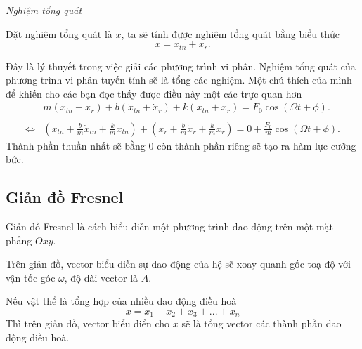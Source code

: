 \documentclass[12pt]{article}
\begin{document}
\underline{\textit{Nghiệm tổng quát}}

Đặt nghiệm tổng quát là \(x\), ta sẽ tính được nghiệm tổng quát bằng biểu thức
\begin{equation}
    x = x_{tn} + x_r.
\end{equation}

Đây là lý thuyết trong việc giải các phương trình vi phân. Nghiệm tổng quát của phương trình vi phân tuyến tính sẽ là tổng các nghiệm. Một chú thích của mình để khiến cho các bạn đọc thấy được điều này một các trực quan hơn
\begin{equation*}
\begin{array}{cc}
    &m (\ddot{x}_{tn} + \ddot{x}_r) + b (\dot{x}_{tn} + \dot{x}_r) + k (x_{tn} + x_{r})  = F_0 \cos{\left(\Omega t + \phi \right)}. 
    \\
    \\
    
    \Leftrightarrow &  \left( \ddot{x}_{tn} + {\displaystyle \frac{b}{m}} \dot{x}_{tn} + {\displaystyle \frac{k}{m}} x_{tn}\right) + \left(    \ddot{x}_{r} + {\displaystyle \frac{b}{m}} \dot{x}_{r} + {\displaystyle \frac{k}{m}} x_{r} \right) = 0 +{\displaystyle \frac{F_0}{m}} \cos{\left(\Omega t + \phi \right)}.
\end{array}
\end{equation*}
Thành phần thuần nhất sẽ bằng \(0\) còn thành phần riêng sẽ tạo ra hàm lực cưỡng bức.
\subsection{Giản đồ Fresnel}
Giản đồ Fresnel là cách biểu diễn một phương trình dao động trên một mặt phẳng \(Oxy\). 
\begin{figure}[!htb]
    \centering
    
    \caption{}
    \label{fig:1.10}
\end{figure}
Trên giản đồ, vector biểu diễn sự dao động của hệ sẽ xoay quanh gốc toạ độ với vận tốc góc \(\omega\), độ dài vector là \(A\). 
\vspace{2mm}

Nếu vật thể là tổng hợp của nhiều dao động điều hoà
\begin{equation*}
    x = x_1 + x_2 + x_3 + ... + x_n
\end{equation*}
Thì trên giản đồ, vector biểu diển cho \(x\) sẽ là tổng vector các thành phần dao động điều hoà.
\begin{figure}[!htb]
    \centering
    
    \caption{}
    \label{fig:1.11}
\end{figure}
\end{document}
